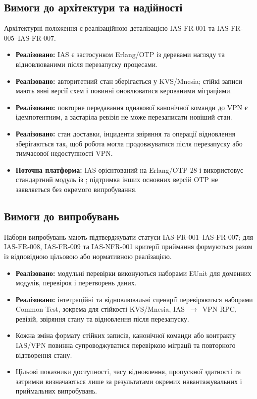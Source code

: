 \documentclass{article}
\begin{document}
\subsection{Вимоги до архітектури та надійності}
Архітектурні положення є реалізаційною деталізацією IAS-FR-001 та IAS-FR-005--IAS-FR-007.
\begin{itemize}
    \item \textbf{Реалізовано:} IAS є застосунком Erlang/OTP із деревами нагляду та відновлюваними після перезапуску процесами.
    \item \textbf{Реалізовано:} авторитетний стан зберігається у KVS/Mnesia; стійкі записи мають явні версії схем і повинні оновлюватися керованими міграціями.
    \item \textbf{Реалізовано:} повторне передавання однакової канонічної команди до VPN є ідемпотентним, а застаріла ревізія не може перезаписати новіший стан.
    \item \textbf{Реалізовано:} стан доставки, інциденти звіряння та операції відновлення зберігаються так, щоб робота могла продовжуватися після перезапуску або тимчасової недоступності VPN.
    \item \textbf{Поточна платформа:} IAS орієнтований на Erlang/OTP 28 і використовує стандартний модуль  із ; підтримка інших основних версій OTP не заявляється без окремого випробування.
\end{itemize}

\subsection{Вимоги до випробувань}
Набори випробувань мають підтверджувати статуси IAS-FR-001--IAS-FR-007; для IAS-FR-008, IAS-FR-009 та IAS-NFR-001 критерії приймання формуються разом із відповідною цільовою або нормативною реалізацією.
\begin{itemize}
    \item \textbf{Реалізовано:} модульні перевірки виконуються наборами EUnit для доменних модулів, перевірок і перетворень даних.
    \item \textbf{Реалізовано:} інтеграційні та відновлювальні сценарії перевіряються наборами Common Test, зокрема для стійкості KVS/Mnesia, IAS~$\rightarrow$~VPN RPC, ревізій, звіряння стану та відновлення після перезапуску.
    \item Кожна зміна формату стійких записів, канонічної команди або контракту IAS/VPN повинна супроводжуватися перевіркою міграції та повторного відтворення стану.
    \item Цільові показники доступності, часу відновлення, пропускної здатності та затримки визначаються лише за результатами окремих навантажувальних і приймальних випробувань.
\end{itemize}
\end{document}
